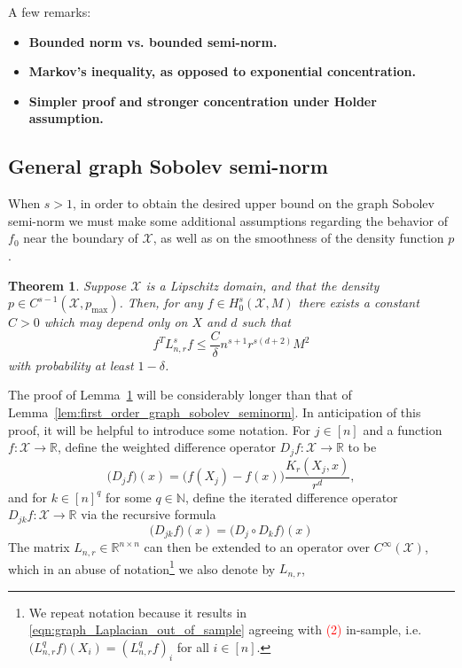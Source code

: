 \documentclass{article}
\newcommand{\Reals}{\mathbb{R}}
\newcommand{\1}{\mathbf{1}}
\newcommand{\Lap}{L}
\newcommand{\Xset}{\mathcal{X}}
\theoremstyle{alden}
\theoremstyle{aldenthm}
\newtheorem{theorem}{Theorem}
\theoremstyle{definition}
\theoremstyle{remark}
\begin{document}
A few remarks:
\begin{itemize}
	\item \textbf{Bounded norm vs. bounded semi-norm.}
	\item \textbf{Markov's inequality, as opposed to exponential concentration.}
	\item \textbf{Simpler proof and stronger concentration under Holder assumption.}
\end{itemize}

\subsection{General graph Sobolev semi-norm}

When $s > 1$, in order to obtain the desired upper bound on the graph Sobolev semi-norm we must make some additional assumptions regarding the behavior of $f_0$ near the boundary of $\Xset$, as well as on the smoothness of the density function $p$.
\begin{theorem}
	\label{thm:graph_sobolev_seminorm}
	Suppose $\Xset $ is a Lipschitz domain, and that the density $p \in C^{s - 1}(\Xset,p_{\max})$. Then, for any $f \in H_0^s(\Xset,M)$ there exists a constant $C > 0$ which may depend only on $X$ and $d$ such that
	\begin{equation}
	\label{eqn:graph_sobolev_seminorm}
	f^T \Lap_{n,r}^s f \leq \frac{C}{\delta} n^{s + 1} r^{s(d + 2)}M^2
	\end{equation}
	with probability at least $1 - \delta$.
\end{theorem}
The proof of Lemma~\ref{thm:graph_sobolev_seminorm} will be considerably longer than that of Lemma~\ref{lem:first_order_graph_sobolev_seminorm}. In anticipation of this proof, it will be helpful to introduce some notation. For $j \in [n]$ and a function $f: \Xset \to \Reals$, define the weighted difference operator $D_jf: \Xset \to \Reals$ to be
\begin{equation*}
\bigl(D_jf\bigr)(x) = \bigl(f(X_j) - f(x)\bigr) \frac{K_r(X_j,x)}{r^d},
\end{equation*}
and for $k \in [n]^q$ for some $q \in \mathbb{N}$, define the iterated difference operator $D_{jk}f: \Xset \to \Reals$ via the recursive formula
\begin{equation*}
\bigl(D_{jk}f\bigr)(x) = \bigl(D_j \circ D_kf\bigr)(x)
\end{equation*}
The matrix $\Lap_{n,r} \in \Reals^{n \times n}$ can then be extended to an operator over $C^{\infty}(\Xset)$, which in an abuse of notation\footnote{We repeat notation because it results in \eqref{eqn:graph_Laplacian_out_of_sample} agreeing with \textcolor{red}{(2)} in-sample, i.e. $\bigl(\Lap_{n,r}^qf\bigr)(X_i) = (\Lap_{n,r}^qf)_i$ for all $i \in [n]$.} we also denote by $\Lap_{n,r}$,
\end{document}

